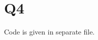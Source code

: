 \pagebreak

\section*{Q4}
\begin{solution}
\hfill\break
Code is given in separate file. 
\end{solution}
